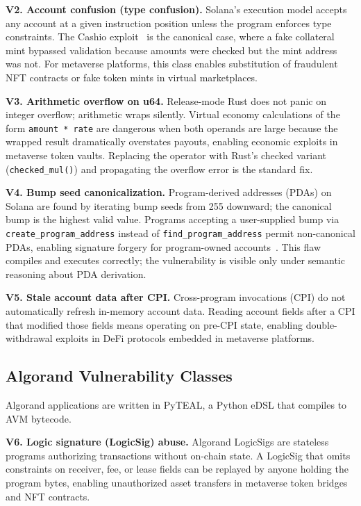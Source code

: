 \documentclass[runningheads]{llncs}
\begin{document}
\textbf{V2. Account confusion (type confusion).}
Solana's execution model accepts any account at a given instruction position
unless the program enforces type constraints.
The Cashio exploit~\cite{halborn2022cashio} is the canonical case, where a fake
collateral mint bypassed validation because amounts were checked but the mint
address was not.
For metaverse platforms, this class enables substitution of fraudulent NFT
contracts or fake token mints in virtual marketplaces.

\textbf{V3. Arithmetic overflow on u64.}
Release-mode Rust does not panic on integer overflow; arithmetic wraps silently.
Virtual economy calculations of the form \texttt{amount * rate} are dangerous
when both operands are large because the wrapped result dramatically overstates
payouts, enabling economic exploits in metaverse token vaults.
Replacing the operator with Rust's checked variant
(\texttt{checked\_mul()}) and propagating the overflow error is the standard fix.

\textbf{V4. Bump seed canonicalization.}
Program-derived addresses (PDAs) on Solana are found by iterating bump seeds
from 255 downward; the canonical bump is the highest valid value.
Programs accepting a user-supplied bump via \texttt{create\_program\_address}
instead of \texttt{find\_program\_address} permit non-canonical PDAs, enabling
signature forgery for program-owned accounts~\cite{ferrante2022sealevel}.
This flaw compiles and executes correctly; the vulnerability is visible only
under semantic reasoning about PDA derivation.

\textbf{V5. Stale account data after CPI.}
Cross-program invocations (CPI) do not automatically refresh in-memory account
data.
Reading account fields after a CPI that modified those fields means operating on
pre-CPI state, enabling double-withdrawal exploits in DeFi protocols embedded
in metaverse platforms.

\subsection{Algorand Vulnerability Classes}

Algorand applications are written in PyTEAL, a Python eDSL that compiles to
AVM bytecode.

\textbf{V6. Logic signature (LogicSig) abuse.}
Algorand LogicSigs are stateless programs authorizing transactions without
on-chain state.
A LogicSig that omits constraints on receiver, fee, or lease fields can be
replayed by anyone holding the program bytes, enabling unauthorized asset
transfers in metaverse token bridges and NFT contracts.
\end{document}
